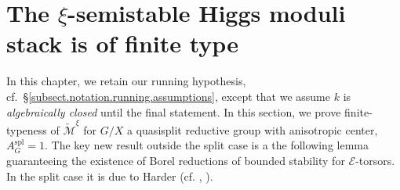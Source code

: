 \documentclass[openany]{amsbook}
\theoremstyle{definition}
\theoremstyle{remark}
\numberwithin{equation}{section}
\newcommand{\cM}{\mathcal{M}}
\newcommand{\cE}{\mathcal{E}}
\renewcommand{\-}{\operatorname{-}}
\newcommand{\ctM}{\widetilde{\cM}}
\newcommand{\spl}{\mathrm{spl}}
\begin{document}
\chapter{\texorpdfstring{The $\xi$-semistable Higgs moduli stack is of finite type}{The xi-semistable Higgs moduli stack is of finite type}}\label{sect.finite.type}

In this chapter, we retain our running hypothesis, cf.\ \S \ref{subsect.notation.running.assumptions}, except that we assume $k$ is \emph{algebraically closed} until the final statement. In this section, we prove finite-typeness of $\ctM^\xi$ for $G/X$ a quasisplit reductive group with anisotropic center, $A_G^\spl = 1$. The key new result outside the split case is a the following lemma guaranteeing the existence of Borel reductions of bounded stability for $\cE$-torsors. In the split case it is due to Harder (cf. \cite{harderborels}, \cite{harderminkowski}). 
\end{document}
